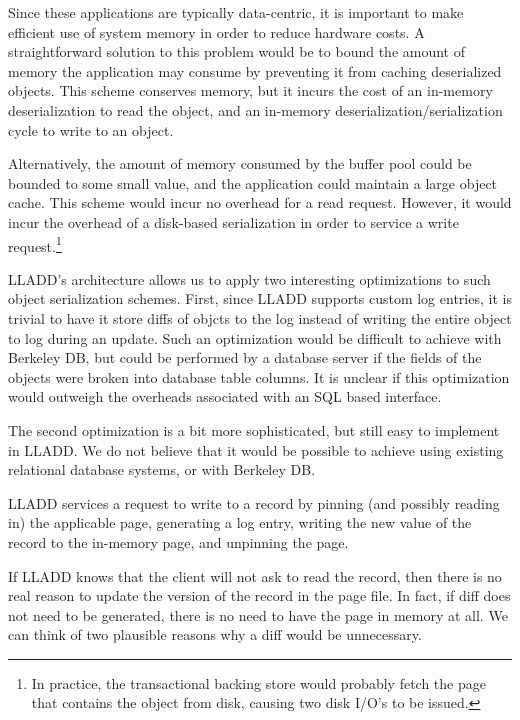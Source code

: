 \documentclass[letterpaper,english]{article}
\begin{document}
Since these applications are typically data-centric, it is important
to make efficient use of system memory in order to reduce hardware
costs.  A straightforward solution to this problem would be to bound
the amount of memory the application may consume by preventing it from
caching deserialized objects.  This scheme conserves memory, but it
incurs the cost of an in-memory deserialization to read the object,
and an in-memory deserialization/serialization cycle to write to an
object.

Alternatively, the amount of memory consumed by the buffer pool could
be bounded to some small value, and the application could maintain a
large object cache.  This scheme would incur no overhead for a read
request.  However, it would incur the overhead of a disk-based
serialization in order to service a write request.\footnote{In
practice, the transactional backing store would probably fetch the
page that contains the object from disk, causing two disk I/O's to be
issued.}

LLADD's architecture allows us to apply two interesting optimizations
to such object serialization schemes.  First, since LLADD supports
custom log entries, it is trivial to have it store diffs of objcts to
the log instead of writing the entire object to log during an update.
Such an optimization would be difficult to achieve with Berkeley DB,
but could be performed by a database server if the fields of the
objects were broken into database table columns.  It is unclear if
this optimization would outweigh the overheads associated with an SQL
based interface.


The second optimization is a bit more sophisticated, but still easy to
implement in LLADD.  We do not believe that it would be possible to
achieve using existing relational database systems, or with Berkeley
DB.  

LLADD services a request to write to a record by pinning (and possibly
reading in) the applicable page, generating a log entry, writing the
new value of the record to the in-memory page, and unpinning the page.

If LLADD knows that the client will not ask to read the record, then
there is no real reason to update the version of the record in the
page file.  In fact, if diff does not need to be generated,
there is no need to have the page in memory at all.  We can think of
two plausible reasons why a diff would be unnecessary.  
\end{document}
